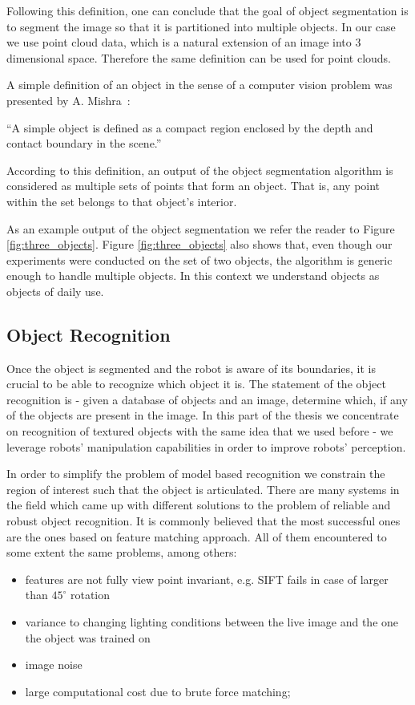  Following this definition, one can conclude that the goal of object segmentation is to segment the image so that it is partitioned into multiple objects. In our case we use point cloud data, which is a natural extension of an image into 3 dimensional space. Therefore the same definition can be used for point clouds. 

A simple definition of an object in the sense of a computer vision problem was presented by A. Mishra~\cite{mishra2012segmenting}:

\noindent ``A simple object is defined as a compact region enclosed by the depth and
contact boundary in the scene.''

According to this definition, an output of the object segmentation algorithm is considered as multiple sets of points that form an object. That is, any point within the set belongs to that object's interior. 

As an example output of the object segmentation we refer the reader to Figure \ref{fig:three_objects}. Figure \ref{fig:three_objects} also shows that, even though our experiments were conducted on the set of two objects, the algorithm is generic enough to handle multiple objects. In this context we understand objects as objects of daily use.


\subsection{Object Recognition}

Once the object is segmented and the robot is aware of its boundaries, it is crucial to be able to recognize which object it is. The statement of the object recognition is -  
given a database of objects and an image, determine which, if any of the objects are present in the image. In this part of the thesis we concentrate on recognition of textured objects with the same idea that we used before - we leverage robots' manipulation capabilities in order to improve robots' perception.

In order to simplify the problem of model based recognition we constrain the region of interest such that the object is articulated. There are many systems in the field which came up with different solutions to the problem of reliable and robust object recognition. It is commonly believed that the most successful ones are the ones based on feature matching approach. All of them encountered to some extent the same problems, among others:

\begin{itemize}
\item features are not fully view point invariant, e.g. SIFT fails in case of larger than
$45^\circ$ rotation
\item  variance to changing lighting conditions between the live
image and the one the object was trained on
\item image noise 
\item large computational cost due to brute force matching;
\end{itemize}

